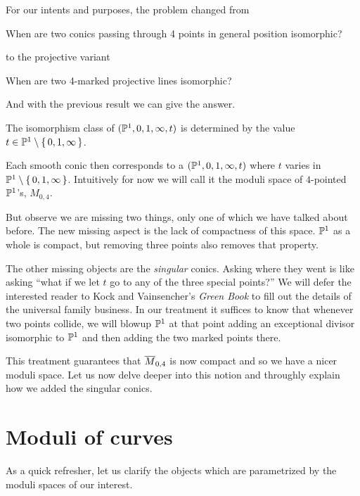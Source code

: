 \documentclass[12pt]{memoir}
\begin{document}
For our intents and purposes, the problem changed from
\begin{significant}
    When are two conics passing through 4 points in general position isomorphic?
\end{significant}
to the projective variant 
\begin{significant}
    When are two 4-marked projective lines isomorphic?
\end{significant}
And with the previous result we can give the answer. 

\begin{Th}
    The isomorphism class of $(\mathbb{P}^1,0,1,\infty,t)$ is determined by the value $t\in\mathbb{P}^1\setminus\{\,0,1,\infty\,\}$. 
\end{Th}

 Each smooth conic then corresponds to a $(\mathbb{P}^1, 0, 1, \infty, t)$ where $t$ varies in $\mathbb{P}^1 \setminus \{\,0,1,\infty\,\}$. Intuitively for now we will call it the moduli space of $4$-pointed $\mathbb{P}^1$'s, $M_{0,4}$.\par

 But observe we are missing two things, only one of which we have talked about before. The new missing aspect is the lack of compactness of this space. $\mathbb{P}^1$ as a whole is compact, but removing three points also removes that property.\par
 The other missing objects are the \emph{singular} conics. Asking where they went is like asking ``what if we let $t$ go to any of the three special points?'' We will defer the interested reader to Kock and Vainsencher's \emph{Green Book} \cite{GreenBookKockVainsencher} to fill out the details of the universal family business. In our treatment it suffices to know that whenever two points collide, we will blowup $\mathbb{P}^1$ at that point adding an exceptional divisor isomorphic to $\mathbb{P}^1$ and then adding the two marked points there.\par
 This treatment guarantees that $\overline M_{0,4}$ is now compact and so we have a nicer moduli space. Let us now delve deeper into this notion and throughly explain how we added the singular conics.


\section{Moduli of curves}

As a quick refresher, let us clarify the objects which are parametrized by the moduli spaces of our interest. 
\end{document}
